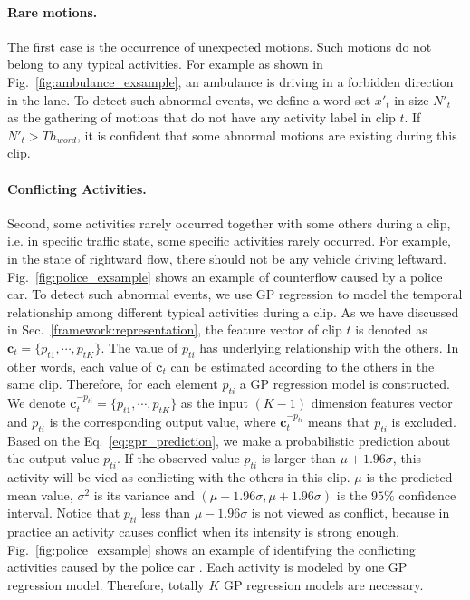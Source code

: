 \paragraph*{Rare motions.} The first case is the occurrence of unexpected motions. Such motions do not belong to any typical activities. For example as shown in Fig.~\ref{fig:ambulance_exsample}, an ambulance is driving in a forbidden direction in the lane. To detect such abnormal events, we define a word set $x'_t$ in size $N'_t$ as the gathering of motions that do not have any activity label in clip $t$. If $N'_t>Th_{word}$, it is confident that some abnormal motions are existing during this clip.  

\paragraph*{Conflicting Activities.} Second, some activities rarely occurred together with some others during a clip, i.e. in specific traffic state, some specific activities rarely occurred. 
For example, in the state of rightward flow, there should not be any vehicle driving leftward. Fig.~\ref{fig:police_exsample} shows an example of counterflow caused by a police car.
To detect such abnormal events, we use GP regression to model the temporal relationship among different typical activities during a clip. 
As we have discussed in Sec.~\ref{framework:representation}, the feature vector of clip $t$ is denoted as $\mathbf{c}_t=\{p_{t1},\cdots,p_{tK}\}$. The value of $p_{ti}$ has underlying relationship with the others. 
In other words, each value of $\mathbf{c}_t$ can be estimated according to the others in the same clip. Therefore, for each element $p_{ti}$ a GP regression model is constructed. We denote $\mathbf{c}_t^{-p_{ti}}=\{p_{t1},\cdots,p_{tK}\}$ as the input $(K-1)$ dimension features vector and $p_{ti}$ is the corresponding output value,  where $\mathbf{c}_t^{-p_{ti}}$ means that $p_{ti}$ is excluded. Based on the Eq.~\eqref{eq:gpr_prediction}, we make a probabilistic prediction about the output value $p_{ti}$. If the observed value $p_{ti}$ is larger than $\mu+1.96\sigma$, this activity will be vied as conflicting with the others in this clip. $\mu$ is the predicted mean value, $\sigma^2$ is its variance and $(\mu-1.96\sigma,\mu+1.96\sigma)$ is the $95\%$ confidence interval. 
Notice that $p_{ti}$ less than $\mu-1.96\sigma$ is not viewed as conflict, because in practice an activity causes conflict when its intensity is strong enough.
Fig.~\ref{fig:police_exsample} shows an example of identifying the conflicting activities caused by the police car . Each activity is modeled by one GP regression model. Therefore, totally $K$ GP regression models are necessary.

